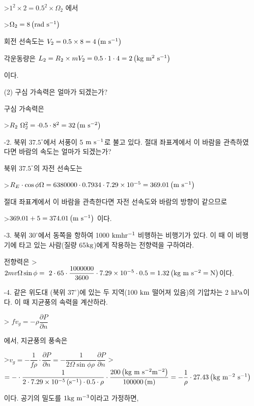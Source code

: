 >$ {1}^2 \times 2 = {0.5}^2 \times \Omega_{2}$ 에서 

>$ \Omega_{2} = 8 \left( \rm rad ~ s^{-1} \right) $

회전 선속도는 
$ V_{2} = 0.5 \times 8 = 4 \left( \rm m ~ s^{-1} \right) $

각운동량은
$ {L}_{2} = R_{2} \times m V_{2} 
= 0.5 \cdot 1 \cdot 4 
= 2 \left( \rm kg ~ m^{2} ~ s^{-1} \right)$

이다.

(2) 구심 가속력은 얼마가 되겠는가?


구심 가속력은

>$ {R}_{2} ~ {\Omega}_{2}^{2}
= \cdot 0.5 \cdot 8^{2}
= 32 \left( \rm m ~ s^{-2} \right)$

-2.  북위  $37.5^{\circ}$에서 서풍이 5 $\rm m ~ s^{-1} $로 불고 있다. 절대 좌표계에서 이 바람을 관측하였다면 바람의 속도는 얼마가 되겠는가?

북위 $37.5^{\circ}$의 자전 선속도는

>$R_{E} \cdot \cos \phi \Omega
= 6380000 \cdot 0.7934 \cdot 7.29 \times 10^{-5}
= 369.01 \left( \rm m ~ s^{-1} \right)$


절대 좌표계에서 이 바람을 관측한다면 자전 선속도와 바람의 방향이 같으므로

>$369.01 + 5 = 374.01 \left( \rm m ~ s^{-1} \right)$ 이다.

-3.  북위  $30^{\circ}$에서 동쪽을 항하여 1000 $\rm km hr^{-1}$ 비행하는 비행기가 있다. 이 때 이 비행기에 타고 있는 사람(질량 65$\rm kg$)에게 작용하는 전향력을 구하여라.

전향력은 
>$ 2 m v \Omega \sin \phi
= \  2 \cdot 65 \cdot \dfrac{1000000} {3600} \cdot 7.29 \times 10^{-5} \cdot 0.5
= 1.32 \left( \rm kg~m ~ s^{-2} = N \right) $이다.

-4.  같은 위도대 (북위  $37^{\circ}$)에 있는 두 지역(100 $\rm km$ 떨어져 있음)의 기압차는 2 $\rm hPa$이다. 이 때 지균풍의 속력을 계산하라.

> $ f v_{g} = - {\rho} \dfrac{\partial P}{\partial n} $

에서, 지균풍의 풍속은 

>$ v_{g} = - \dfrac{1}{f \rho} \cdot \dfrac{\partial P}{\partial n}
= - \dfrac{1}{2 \Omega \sin \phi \rho~} \dfrac{\partial P}{\partial n} $
>$= - \cdot \dfrac{1}{2 \cdot 7.29 \times 10^{-5} \left( \rm s^{-1} \right) \cdot 0.5 \cdot \rho} \cdot \dfrac{200 \left( \rm kg~m~s^{-2} m^{-2} \right)} {100000 \left( \rm m \right)} 
= - \dfrac{1}{\rho} \cdot 27.43 \left( \rm kg~m^{-2}~ s^{-1} \right) $

이다. 공기의 밀도를 $ 1\rm kg~m^{-3}$이라고 가정하면, 

